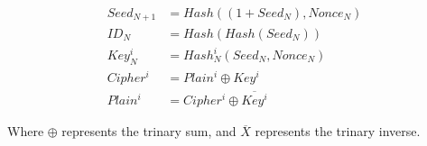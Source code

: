 \documentclass[11pt]{IEEEtran}
\begin{document}
\begin{align}
Seed_{N+1} &= Hash ( (1 + Seed_N), Nonce_N ) \\
ID_N &= Hash(Hash(Seed_N) ) \\
Key_{N}^i &= Hash_{N}^i(Seed_N, Nonce_N) \\
Cipher^i &= Plain^i \oplus Key^i \\
Plain^i &= Cipher^i \oplus \overline{Key^i}
\end{align}

Where $\oplus$ represents the trinary sum, and $\overline{X}$ represents the trinary inverse.
\end{document}
